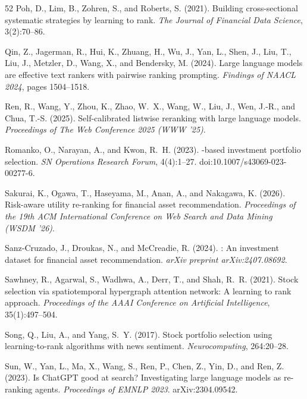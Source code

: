 {\begin{thebibliography}{52}
Poh, D., Lim, B., Zohren, S., and Roberts, S. (2021).
\newblock Building cross-sectional systematic strategies by learning to rank.
\newblock \emph{The Journal of Financial Data Science}, 3(2):70--86.

Qin, Z., Jagerman, R., Hui, K., Zhuang, H., Wu, J., Yan, L., Shen, J., Liu, T., Liu, J., Metzler, D., Wang, X., and Bendersky, M. (2024).
\newblock Large language models are effective text rankers with pairwise ranking prompting.
\newblock \emph{Findings of NAACL 2024}, pages 1504--1518.

Ren, R., Wang, Y., Zhou, K., Zhao, W.~X., Wang, W., Liu, J., Wen, J.-R., and Chua, T.-S. (2025).
\newblock Self-calibrated listwise reranking with large language models.
\newblock \emph{Proceedings of The Web Conference 2025 (WWW '25)}.

Romanko, O., Narayan, A., and Kwon, R.~H. (2023).
-based investment portfolio selection.
\newblock \emph{SN Operations Research Forum}, 4(4):1--27. doi:10.1007/s43069-023-00277-6.

Sakurai, K., Ogawa, T., Haseyama, M., Anan, A., and Nakagawa, K. (2026).
\newblock Risk-aware utility re-ranking for financial asset recommendation.
\newblock \emph{Proceedings of the 19th ACM International Conference on Web Search and Data Mining (WSDM '26)}.

Sanz-Cruzado, J., Droukas, N., and McCreadie, R. (2024).
: An investment dataset for financial asset recommendation.
\newblock \emph{arXiv preprint arXiv:2407.08692}.

Sawhney, R., Agarwal, S., Wadhwa, A., Derr, T., and Shah, R.~R. (2021).
\newblock Stock selection via spatiotemporal hypergraph attention network: A learning to rank approach.
\newblock \emph{Proceedings of the AAAI Conference on Artificial Intelligence}, 35(1):497--504.

Song, Q., Liu, A., and Yang, S.~Y. (2017).
\newblock Stock portfolio selection using learning-to-rank algorithms with news sentiment.
\newblock \emph{Neurocomputing}, 264:20--28.

Sun, W., Yan, L., Ma, X., Wang, S., Ren, P., Chen, Z., Yin, D., and Ren, Z. (2023).
\newblock Is {ChatGPT} good at search? Investigating large language models as re-ranking agents.
\newblock \emph{Proceedings of EMNLP 2023}. arXiv:2304.09542.


\end{thebibliography}}
